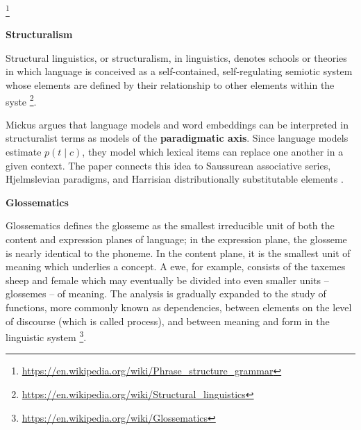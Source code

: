 \documentclass{book}
\providecommand{\ProjectDeepHeading}[2]{%
    \par\medskip\noindent\textbf{#2}\par\smallskip
}
\providecommand{\seeherefooter}[1]{\footnote{\url{#1}}}
\begin{document}

\seeherefooter{https://en.wikipedia.org/wiki/Phrase_structure_grammar}

\ProjectDeepHeading{6}{Structuralism}


Structural linguistics, or structuralism, in linguistics, denotes schools or theories in which language is conceived as a self-contained, self-regulating semiotic system whose elements are defined by their relationship to other elements within the syste \seeherefooter{https://en.wikipedia.org/wiki/Structural_linguistics}.


\cite{mickus-2024-language-models-and-the-paradigmatic-axis} Mickus argues that language models and word embeddings can be interpreted in structuralist terms as models of the \textbf{paradigmatic axis}. Since language models estimate \(p(t \mid c)\), they model which lexical items can replace one another in a given context. The paper connects this idea to Saussurean associative series, Hjelmslevian paradigms, and Harrisian distributionally substitutable elements \cite{mickus-2024-language-models-and-the-paradigmatic-axis}.

\ProjectDeepHeading{7}{Glossematics}


Glossematics defines the glosseme as the smallest irreducible unit of both the content and expression planes of language; in the expression plane, the glosseme is nearly identical to the phoneme. In the content plane, it is the smallest unit of meaning which underlies a concept. A ewe, for example, consists of the taxemes sheep and female which may eventually be divided into even smaller units – glossemes – of meaning. The analysis is gradually expanded to the study of functions, more commonly known as dependencies, between elements on the level of discourse (which is called process), and between meaning and form in the linguistic system  \seeherefooter{https://en.wikipedia.org/wiki/Glossematics}.
\end{document}
